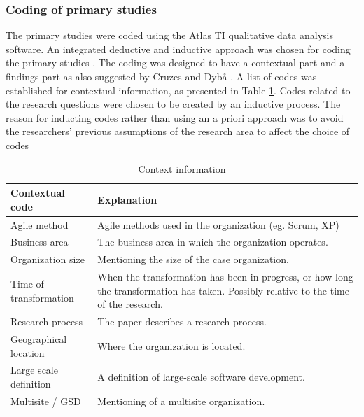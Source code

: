 \subsubsection{Coding of primary studies}
\label{sec:coding}

The primary studies were coded using the Atlas TI qualitative data analysis software.
An integrated deductive and inductive approach was chosen for coding the primary
studies \cite{Cruzes2011a}. The coding was designed to have a contextual part
and a findings part as also suggested by Cruzes and Dybå \cite{Cruzes2011a}. A
list of codes was established for contextual information, as presented in Table
\ref{table:contextualcodes}. Codes related to the research questions were chosen
to be created by an inductive process. The reason for inducting codes rather
than using an a priori approach was to avoid the researchers' previous
assumptions of the research area to affect the choice of codes

\begin{table}[h]
    \centering
    \begin{tabular}{ >{\raggedright\arraybackslash}p{}
                     >{\raggedright\arraybackslash}p{} }
        \toprule
        Contextual code     & Explanation   \\
        \midrule

Agile method & Agile methods used in the organization (eg. Scrum, XP) \\

Business area & The business area in which the organization operates. \\

Organization size & Mentioning the size of the case organization. \\

Time of transformation & When the transformation has been in
progress, or how long the transformation has taken. Possibly relative to
the time of the research. \\

Research process & The paper describes a research process. \\

Geographical location & Where the organization is located. \\

Large scale definition & A definition of large-scale software development. \\

Multisite / GSD & Mentioning of a multisite organization. \\

        \bottomrule
    \end{tabular}
    \caption{Context information}
    \label{table:contextualcodes}
\end{table}

